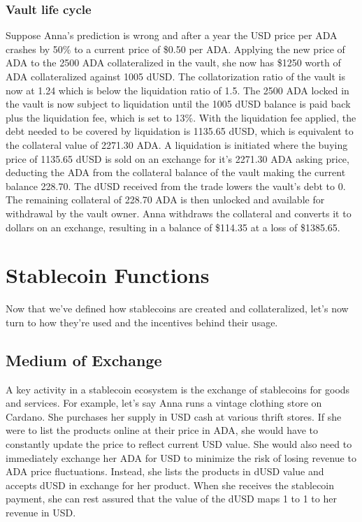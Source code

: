 \documentclass[12pt]{article}
\begin{document}
	\subsubsection{Vault life cycle}

Suppose Anna's prediction is wrong and after a year the USD price per ADA crashes by 50\% to a current price of \$0.50 per ADA. Applying the new price of ADA to the 2500 ADA collateralized in the vault, she now has \$1250 worth of ADA collateralized against 1005 dUSD. The collatorization ratio of the vault is now at 1.24 which is below the liquidation ratio of 1.5. The 2500 ADA locked in the vault is now subject to liquidation until the 1005 dUSD balance is paid back plus the liquidation fee, which is set to 13\%. With the liquidation fee applied, the debt needed to be covered by liquidation is 1135.65 dUSD, which is equivalent to the collateral value of 2271.30 ADA. A liquidation is initiated where the buying price of 1135.65 dUSD is sold on an exchange for it's 2271.30 ADA asking price, deducting the ADA from the collateral balance of the vault making the current balance 228.70. The dUSD received from the trade lowers the vault's debt to 0. The remaining collateral of 228.70 ADA is then unlocked and available for withdrawal by the vault owner. Anna withdraws the collateral and converts it to dollars on an exchange, resulting in a balance of \$114.35 at a loss of \$1385.65.

\section{Stablecoin Functions}

Now that we've defined how stablecoins are created and collateralized, let's now turn to how they're used and the incentives behind their usage.

\subsection{Medium of Exchange}

A key activity in a stablecoin ecosystem is the exchange of stablecoins for goods and services. For example, let's say Anna runs a vintage clothing store on Cardano. She purchases her supply in USD cash at various thrift stores. If she were to list the products online at their price in ADA, she would have to constantly update the price to reflect current USD value. She would also need to immediately exchange her ADA for USD to minimize the risk of losing revenue to ADA price fluctuations. Instead, she lists the products in dUSD value and accepts dUSD in exchange for her product. When she receives the stablecoin payment, she can rest assured that the value of the dUSD maps 1 to 1 to her revenue in USD.
\end{document}
